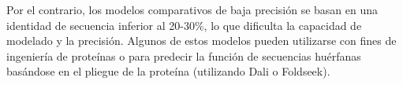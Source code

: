 Por el contrario, los modelos comparativos de baja precisión se basan en una identidad de secuencia inferior al 20-30\%, lo que dificulta la capacidad de modelado y la precisión. Algunos de estos modelos pueden utilizarse con fines de ingeniería de proteínas o para predecir la función de secuencias huérfanas basándose en el pliegue de la proteína (utilizando Dali o Foldseek).
